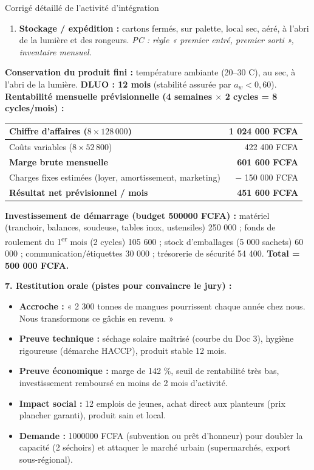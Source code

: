 \documentclass[11pt]{article}
\begin{document}
\begin{exoresolu}{Corrigé détaillé de l'activité d'intégration}
\begin{center}
{\begin{minipage}{0.92\linewidth}
\begin{enumerate}
    \item \textbf{Stockage / expédition :} cartons fermés, sur palette, local sec, aéré, à l'abri de la lumière et des rongeurs. \emph{PC : règle « premier entré, premier sorti », inventaire mensuel.}
\end{enumerate}
\textbf{Conservation du produit fini :} température ambiante (20--30 \textdegree C), au sec, à l'abri de la lumière. \textbf{DLUO : 12 mois} (stabilité assurée par $a_w < 0,60$). \\[0.5em]
\textbf{Rentabilité mensuelle prévisionnelle (4 semaines $\times$ 2 cycles = 8 cycles/mois) :}
\begin{center}
\begin{tabular}{|l|r|}\hline
Chiffre d'affaires ($8 \times 128\,000$) & 1 024 000 FCFA \\ \hline
Coûts variables ($8 \times 52\,800$) & 422 400 FCFA \\ \hline
\textbf{Marge brute mensuelle} & \textbf{601 600 FCFA} \\ \hline
Charges fixes estimées (loyer, amortissement, marketing) & $-$ 150 000 FCFA \\ \hline
\textbf{Résultat net prévisionnel / mois} & \textbf{451 600 FCFA} \\ \hline
\end{tabular}
\end{center}
\textbf{Investissement de démarrage (budget \num{500000} FCFA) :} matériel (tranchoir, balances, soudeuse, tables inox, ustensiles) 250 000 ; fonds de roulement du 1\textsuperscript{er} mois (2 cycles) 105 600 ; stock d'emballages (5 000 sachets) 60 000 ; communication/étiquettes 30 000 ; trésorerie de sécurité 54 400. \textbf{Total = 500 000 FCFA.}
\end{minipage}}
\end{center}

\noindent\textbf{7. Restitution orale (pistes pour convaincre le jury) :}
\begin{itemize}
    \item \textbf{Accroche :} « 2 300 tonnes de mangues pourrissent chaque année chez nous. Nous transformons ce gâchis en revenu. »
    \item \textbf{Preuve technique :} séchage solaire maîtrisé (courbe du Doc 3), hygiène rigoureuse (démarche HACCP), produit stable 12 mois.
    \item \textbf{Preuve économique :} marge de 142 \%, seuil de rentabilité très bas, investissement remboursé en moins de 2 mois d'activité.
    \item \textbf{Impact social :} 12 emplois de jeunes, achat direct aux planteurs (prix plancher garanti), produit sain et local.
    \item \textbf{Demande :} \num{1000000} FCFA (subvention ou prêt d'honneur) pour doubler la capacité (2 séchoirs) et attaquer le marché urbain (supermarchés, export sous-régional).
\end{itemize}
\end{exoresolu}
\end{document}
